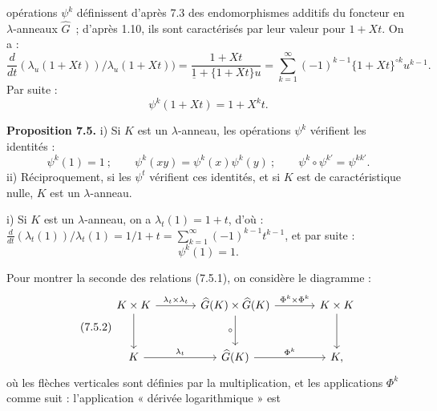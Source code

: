 opérations \(\psi^k\)
définissent d'après 7.3 des endomorphismes additifs du foncteur en \(\lambda\)-anneaux \(\widehat G\)~; d'après 1.10, ils sont caractérisés par leur valeur pour \(1+Xt\). On a :
\[
  \frac{d}{dt}(\lambda_u(1+Xt))/\lambda_u(1+Xt))
  =
  \frac{1+Xt}{\underline{1}+\{1+Xt\}u}
  =
  \sum_{k=1}^{\infty}(-1)^{k-1}\{1+Xt\}^{\circ k}u^{k-1}.
\]
Par suite :
\begin{equation}\tag{7.4.1}
  \psi^k(1+Xt)=1+X^k t.
\end{equation}

\textbf{Proposition 7.5.} i) Si \(K\) est un \(\lambda\)-anneau, les opérations \(\psi^k\) vérifient les identités :
\begin{equation}\tag{7.5.1}
  \psi^k(1)=1~;\qquad
  \psi^k(xy)=\psi^k(x)\psi^k(y)~;\qquad
  \psi^k\circ\psi^{k'}=\psi^{kk'}.
\end{equation}
ii) Réciproquement, si les \(\psi^t\) vérifient ces identités, et si \(K\) est de caractéristique nulle, \(K\) est un \(\lambda\)-anneau.

i) Si \(K\) est un \(\lambda\)-anneau, on a \(\lambda_t(1)=1+t\), d'où : \(\frac{d}{dt}(\lambda_t(1))/\lambda_t(1)=1/1+t=\sum_{k=1}^{\infty}(-1)^{k-1}t^{k-1}\), et par suite :
\[
  \psi^k(1)=1.
\]

Pour montrer la seconde des relations (7.5.1), on considère le diagramme :
\begin{equation}\tag{7.5.2}
\begin{tikzcd}[column sep=large,row sep=large]
K\times K \arrow[r,"\lambda_t\times\lambda_t"] \arrow[d] &
\widehat G(K)\times\widehat G(K) \arrow[r,"\Phi^k\times\Phi^k"] \arrow[d,"\circ"'] &
K\times K \arrow[d]\\
K \arrow[r,"\lambda_t"] &
\widehat G(K) \arrow[r,"\Phi^k"] &
K ,
\end{tikzcd}
\end{equation}
où les flèches verticales sont définies par la multiplication, et les applications \(\Phi^k\) comme suit : l'application « dérivée logarithmique » est

